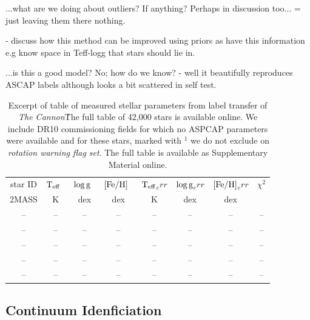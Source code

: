 \documentclass[12pt, preprint]{aastex}
\newcommand{\teff}{\mbox{$\rm T_{eff}$}}
\newcommand{\feh}{\mbox{$\rm [Fe/H]$}}
\newcommand{\logg}{\mbox{$\rm \log g$}}
\newcommand{\tc}{\textsl{The Cannon}}
\begin{document}
...what are we doing about outliers?  If anything?  Perhaps in discussion too... = just leaving them there nothing. 

- discuss how this method can be improved using priors as have this information e.g know space in Teff-logg that stars should lie in. 

...is this a good model?  No; how do we know? - well it beautifully reproduces ASCAP labels although looks a bit scattered in self test.


\begin{table}
\centering
\caption{Excerpt of table of measured stellar parameters from label transfer of \tc\. The full table of 42,000 stars is available online. We include DR10 commissioning fields for which no ASPCAP parameters were available and for these stars, marked with $^1$ we do not exclude on \textit{rotation warning flag set}. The full table is available as Supplementary Material online.}

\begin{tabular}{| c | c | c |  c | c | c |  c | c |}
\hline
star ID & \teff\ & \logg\ & \feh\ & \teff\mbox{$_err$} & \logg\mbox{$_err$} & \feh\mbox{$_err$} & $\chi^2$\\
{2MASS} &  K &  dex  & dex & K & dex & dex & \\    
\hline
-- &    -- &      -- &      -- &    -- &   -- &     -- & -- \\
-- &      -- &    -- &      -- &    -- &   -- &    -- & -- \\
-- &      --&     -- &    -- &    -- &     -- &     --&  -- \\
-- &    -- &      -- &    -- &    -- &   -- &    --&  -- \\
-- &     -- &    --&      -- &    -- &    --&      -- & -- \\
 \hline
\end{tabular}
\label{tab:online}
\end{table}  

\subsection{Continuum Idenficiation}
\end{document}
